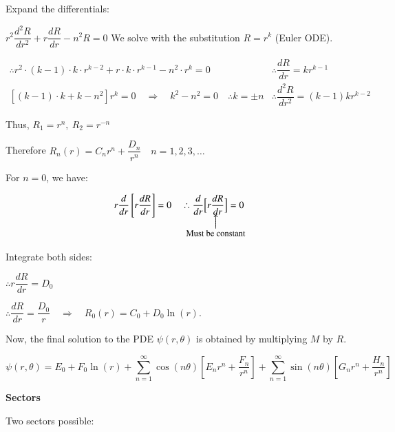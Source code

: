 \documentclass{report}
\makeatletter
\newcommand\parrow[3][3ex]{%
 \begin{array}[t]{@{}c@{}} #2 \\
  \left\uparrow\vcenter{\hrule height #1}\right.\kern-\nulldelimiterspace\\
  \makebox[0pt]{\small#3}
  \end{array}%
}
\makeatother
\begin{document}
Expand the differentials:

$r^{2} \dfrac{d^{2} R}{d r^{2}}+r \dfrac{d R}{d r}-n^{2} R=0$ We solve with the substitution $R=r^{k}$ (Euler ODE).

$$
\begin{array}{ll}
\therefore r^{2} \cdot(k-1) \cdot k \cdot r^{k-2}+r \cdot k \cdot r^{k-1}-n^{2} \cdot r^{k}=0 & \therefore \dfrac{d R}{d r}=k r^{k-1} \\
\left[(k-1) \cdot k+k-n^{2}\right] r^{k}=0\quad \Rightarrow\quad k^{2}-n^{2}=0 \quad \therefore k= \pm n & \therefore \dfrac{d^{2} R}{d r^{2}}=(k-1) k r^{k-2}
 \end{array} 
$$

Thus, $R_{1}=r^{n},\ R_{2}=r^{-n}$

Therefore $R_{n}(r)=C_{n} r^{n}+\dfrac{D_{n}}{r^{n}} \quad n=1,2,3, \ldots$

For $n=0$, we have:

$$
r \dfrac{d}{d r}\left[r \dfrac{d R}{d r}\right]=0 \quad \therefore \dfrac{d}{d r}\Big[\parrow{r \dfrac{d R}{d r}}{Must be constant}\Big]=0 
$$

Integrate both sides:

$\therefore r \dfrac{d R}{d r}=D_{0}$

$\therefore \dfrac{d R}{d r}=\dfrac{D_{0}}{r}\quad \Rightarrow\quad R_{0}(r)=C_{0}+D_{0} \ln (r).$

Now, the final solution to the PDE $\psi(r, \theta)$ is obtained by multiplying $M$ by $R$.

\[
\boxed{
\psi(r, \theta)=E_{0}+F_{0}\ln(r)
+\sum_{n=1}^{\infty}\cos(n\theta)\left[E_{n}r^{n}+\frac{F_{n}}{r^{n}}\right]
+\sum_{n=1}^{\infty}\sin(n\theta)\left[G_{n}r^{n}+\frac{H_{n}}{r^{n}}\right]
}
\]

\textbf{Sectors}

Two sectors possible:
\end{document}
